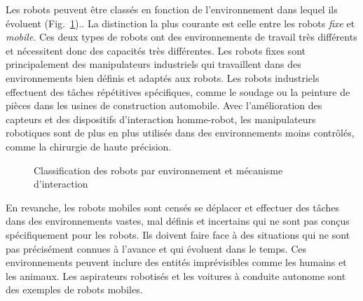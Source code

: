 Les robots peuvent être classés en fonction de l'environnement dans lequel ils évoluent (Fig.~\ref{fig.classification1}).. La distinction la plus courante est celle entre les robots \emph{fixe} et \emph{mobile}. Ces deux types de robots ont des environnements de travail très différents et nécessitent donc des capacités très différentes. Les robots fixes sont principalement des manipulateurs industriels qui travaillent dans des environnements bien définis et adaptés aux robots. Les robots industriels effectuent des tâches répétitives spécifiques, comme le soudage ou la peinture de pièces dans les usines de construction automobile. Avec l'amélioration des capteurs et des dispositifs d'interaction homme-robot, les manipulateurs robotiques sont de plus en plus utilisés dans des environnements moins contrôlés, comme la chirurgie de haute précision.

\begin{figure}
\begin{center}
\end{center}
\caption{Classification des robots par environnement et mécanisme d'interaction}\label{fig.classification1}
\end{figure}

En revanche, les robots mobiles sont censés se déplacer et effectuer des tâches dans des environnements vastes, mal définis et incertains qui ne sont pas conçus spécifiquement pour les robots. Ils doivent faire face à des situations qui ne sont pas précisément connues à l'avance et qui évoluent dans le temps. Ces environnements peuvent inclure des entités imprévisibles comme les humains et les animaux. Les aspirateurs robotisés et les voitures à conduite autonome sont des exemples de robots mobiles. 


